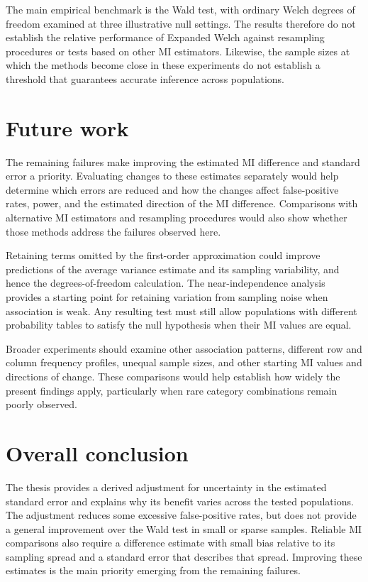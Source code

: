The main empirical benchmark is the Wald test, with ordinary Welch
degrees of freedom examined at three illustrative null settings. The
results therefore do not establish the relative performance of Expanded
Welch against resampling procedures or tests based on other MI estimators.
Likewise, the sample sizes at which the methods become close in these
experiments do not establish a threshold that guarantees accurate
inference across populations.

\section{Future work}

The remaining failures make improving the estimated MI difference and
standard error a priority. Evaluating changes to these estimates
separately would help determine which errors are reduced and how the
changes affect false-positive rates, power, and the estimated direction of
the MI difference. Comparisons with alternative MI estimators and
resampling procedures would also show whether those methods address the
failures observed here.

Retaining terms omitted by the first-order approximation could improve
predictions of the average variance estimate and its sampling variability,
and hence the degrees-of-freedom calculation. The near-independence
analysis provides a starting point for retaining variation from sampling
noise when association is weak. Any resulting test must still allow
populations with different probability tables to satisfy the null
hypothesis when their MI values are equal.

Broader experiments should examine other association patterns, different
row and column frequency profiles, unequal sample sizes, and other starting MI
values and directions of change. These comparisons would help establish
how widely the present findings apply, particularly when rare category
combinations remain poorly observed.

\section{Overall conclusion}

The thesis provides a derived adjustment for uncertainty in the estimated
standard error and explains why its benefit varies across the tested
populations. The adjustment reduces some excessive false-positive rates,
but does not provide a general improvement over the Wald test in small or
sparse samples. Reliable MI comparisons also require a difference estimate
with small bias relative to its sampling spread and a standard error that
describes that spread. Improving these estimates is the main priority
emerging from the remaining failures.
